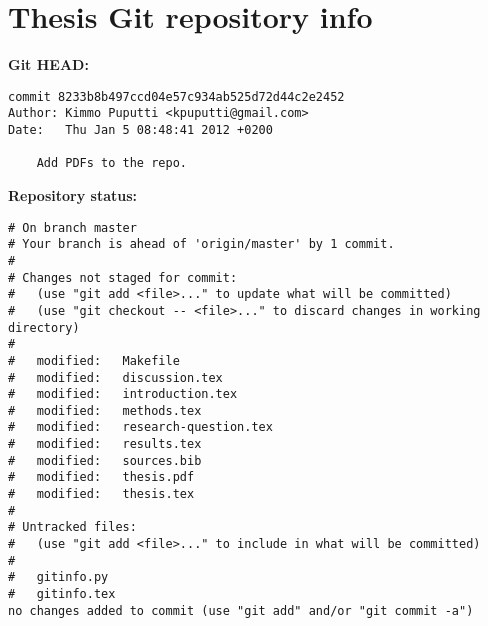 \section{Thesis Git repository info}

\textbf{Git HEAD:}

\begin{verbatim}
commit 8233b8b497ccd04e57c934ab525d72d44c2e2452
Author: Kimmo Puputti <kpuputti@gmail.com>
Date:   Thu Jan 5 08:48:41 2012 +0200

    Add PDFs to the repo.
\end{verbatim}

\noindent \textbf{Repository status:}
\begin{verbatim}
# On branch master
# Your branch is ahead of 'origin/master' by 1 commit.
#
# Changes not staged for commit:
#   (use "git add <file>..." to update what will be committed)
#   (use "git checkout -- <file>..." to discard changes in working directory)
#
#	modified:   Makefile
#	modified:   discussion.tex
#	modified:   introduction.tex
#	modified:   methods.tex
#	modified:   research-question.tex
#	modified:   results.tex
#	modified:   sources.bib
#	modified:   thesis.pdf
#	modified:   thesis.tex
#
# Untracked files:
#   (use "git add <file>..." to include in what will be committed)
#
#	gitinfo.py
#	gitinfo.tex
no changes added to commit (use "git add" and/or "git commit -a")
\end{verbatim}

